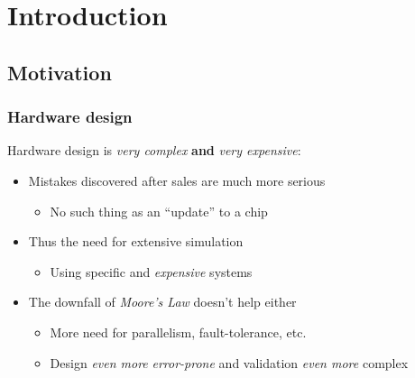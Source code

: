 \section{Introduction}
\label{sec:introduction}
    \frame{\sectionpage}

    \subsection{Motivation}
    \label{subsec:motivation}
        \begin{frame}
            \frametitle{Hardware design}

            \par{Hardware design is \emph{very complex} \textbf{and} \emph{very expensive}:}
            \vspace{0.2cm}
            \begin{itemize}
                \item Mistakes discovered after sales are much more serious
                    \begin{itemize}
                        \item No such thing as an ``update'' to a chip
                    \end{itemize}
                \item Thus the need for extensive simulation
                    \begin{itemize}
                        \item Using specific and \emph{expensive} systems
                    \end{itemize}
                \item The downfall of \emph{Moore's Law} doesn't help either
                    \begin{itemize}
                        \item More need for parallelism, fault-tolerance, etc.
                        \item Design \emph{even more} \emph{error-prone} and validation \emph{even more} complex
                    \end{itemize}
            \end{itemize}

        \end{frame}

